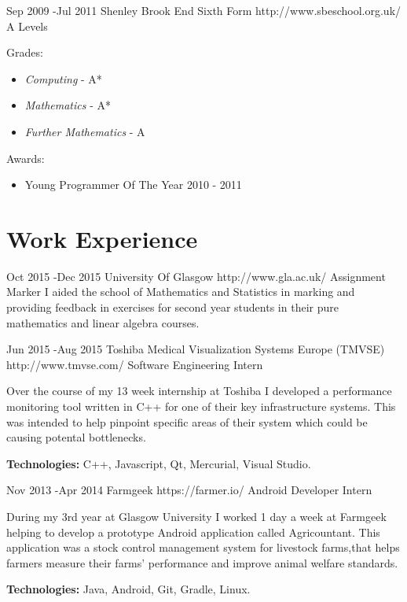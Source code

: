 \documentclass[10pt]{article} %
\begin{document}
\job
{Sep 2009 -}{Jul 2011}
{Shenley Brook End Sixth Form}
{http://www.sbeschool.org.uk/}
{A Levels}
{Grades:
\begin{itemize}[noitemsep]
\item{\textit{Computing} - A*}
\item{\textit{Mathematics} - A*}
\item{\textit{Further Mathematics} - A}
\end{itemize}
Awards:
\begin{itemize}[noitemsep]
\item{Young Programmer Of The Year 2010 - 2011}
\end{itemize}
}


\section{Work Experience}

\job
{Oct 2015 -}{Dec 2015}
{University Of Glasgow}
{http://www.gla.ac.uk/}
{Assignment Marker}
{I aided the school of Mathematics and Statistics in marking and providing feedback in exercises for second year students in 
 their pure mathematics and linear algebra courses.}


\job
{Jun 2015 -}{Aug 2015}
{Toshiba Medical Visualization Systems Europe (TMVSE)}
{http://www.tmvse.com/}
{Software Engineering Intern}
{Over the course of my 13 week internship at Toshiba I developed a performance monitoring tool
written in C++ for one of their key infrastructure systems. This was intended to help pinpoint specific areas of their system which could be causing potental bottlenecks.
\\
\rule{0mm}{5mm}\textbf{Technologies:} C++, Javascript, Qt, Mercurial, Visual Studio.}


\job
{Nov 2013 -}{Apr 2014}
{Farmgeek}
{https://farmer.io/}
{Android Developer Intern}
{During my 3rd year at Glasgow University I worked 1 day a week at Farmgeek helping to develop a prototype Android application called Agricountant. This application was a stock control management system for livestock farms,that helps farmers measure their farms' performance and improve animal welfare standards.
\\
\rule{0mm}{5mm}\textbf{Technologies:} Java, Android, Git, Gradle, Linux.}
\end{document}
